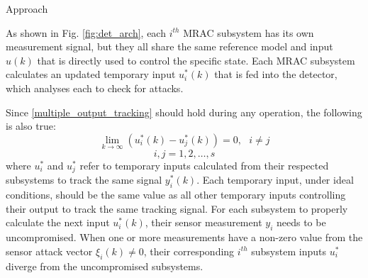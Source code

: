 \begin{section}{Approach}
	
As shown in Fig. \ref{fig:det_arch}, each $i^{th}$ MRAC subsystem has its own measurement signal, but they all share the same reference model and input $u(k)$ that is directly used to control the specific state. Each MRAC subsystem calculates an updated temporary input $u^*_i(k)$ that is fed into the detector, which analyses each to check for attacks. 

Since \eqref{multiple_output_tracking} should hold during any operation, the following is also true:
\begin{equation}
    \label{eq:u_to_0}
    \lim_{k\to\infty}(u^*_i(k)-u^*_j(k))=0, \text{ }i\neq j
\end{equation}
\begin{equation}
    i,j = 1,2,\dots,s \nonumber
\end{equation}
where $u^*_i$ and $u^*_j$ refer to temporary inputs calculated from their respected subsystems to track the same signal $y_i^*(k)$. Each temporary input, under ideal conditions, should be the same value as all other temporary inputs controlling their output to track the same tracking signal. For each subsystem to properly calculate the next input $u^*_i(k)$, their sensor measurement $y_i$ needs to be uncompromised. When one or more measurements have a non-zero value from the sensor attack vector $\xi_i(k) \neq 0$, their corresponding $i^{th}$ subsystem inputs $u^*_i$ diverge from the uncompromised subsystems.


\end{section}
